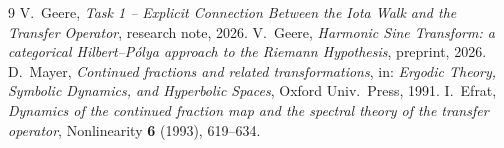 \documentclass[11pt,a4paper]{article}
\begin{document}
\begin{thebibliography}{9}
 V.\ Geere, \emph{Task 1 -- Explicit Connection Between the Iota Walk and the Transfer Operator}, research note, 2026.
 V.\ Geere, \emph{Harmonic Sine Transform: a categorical Hilbert--Pólya approach to the Riemann Hypothesis}, preprint, 2026.
 D.\ Mayer, \emph{Continued fractions and related transformations}, in: \textit{Ergodic Theory, Symbolic Dynamics, and Hyperbolic Spaces}, Oxford Univ.\ Press, 1991.
 I.\ Efrat, \emph{Dynamics of the continued fraction map and the spectral theory of the transfer operator}, Nonlinearity \textbf{6} (1993), 619--634.
\end{thebibliography}
\end{document}
